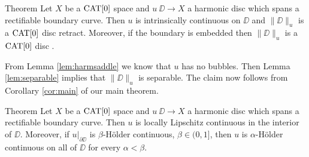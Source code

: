 \documentclass{article}
\begin{document}
\begin{thm}{Theorem}\label{thm:harmonic}
Let $X$ be a $\mathop{\rm CAT}\nolimits[0]$ space 
and $u\:\DD\to X$ a harmonic disc which spans a rectifiable boundary curve. 
Then $u$ is intrinsically continuous on $\DD$ and $\|\DD\|_u$ is a $\mathop{\rm CAT}\nolimits[0]$ disc retract. 
Moreover, if the boundary is embedded then $\|\DD\|_u$ is a $\mathop{\rm CAT}\nolimits[0]$ disc .
\end{thm}

From Lemma \ref{lem:harmsaddle} we know that $u$ has no bubbles. 
Then Lemma \ref{lem:separable} implies that 
$\|\DD\|_u$ is separable. 
The claim now follows from Corollary \ref{cor:main} of our main theorem.
\qeds



\begin{thm}{Theorem}\label{thm:Lipregularity}
Let $X$ be a $\mathop{\rm CAT}\nolimits[0]$ space 
and $u\:\DD\to X$ a harmonic disc which spans a rectifiable boundary curve. 
Then $u$ is locally Lipschitz continuous in the interior of $\DD$. 
Moreover, if $u|_{\partial\DD}$ is $\beta$-H\"older continuous, $\beta\in(0,1]$, then $u$ is $\alpha$-H\"older continuous on all of
$\DD$ for every $\alpha<\beta$.
\end{thm}
\end{document}
